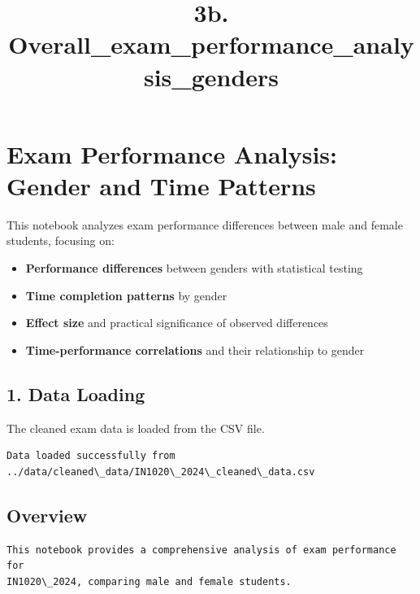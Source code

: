 \documentclass[11pt]{article}
\title{3b. Overall\_exam\_performance\_analysis\_genders}
\providecommand{\tightlist}{%
      \setlength{\itemsep}{0pt}\setlength{\parskip}{0pt}}
\begin{document}
    
    \maketitle
    
    

    
    \section{Exam Performance Analysis: Gender and Time
Patterns}\label{exam-performance-analysis-gender-and-time-patterns}

This notebook analyzes exam performance differences between male and
female students, focusing on:

\begin{itemize}
\tightlist
\item
  \textbf{Performance differences} between genders with statistical
  testing
\item
  \textbf{Time completion patterns} by gender
\item
  \textbf{Effect size} and practical significance of observed
  differences
\item
  \textbf{Time-performance correlations} and their relationship to
  gender
\end{itemize}

    \subsection{1. Data Loading}\label{data-loading}

The cleaned exam data is loaded from the CSV file.

    \begin{Verbatim}[commandchars=\\\{\}]
Data loaded successfully from ../data/cleaned\_data/IN1020\_2024\_cleaned\_data.csv
    \end{Verbatim}

    \subsection{Overview}\label{overview}

    \begin{Verbatim}[commandchars=\\\{\}]
This notebook provides a comprehensive analysis of exam performance for
IN1020\_2024, comparing male and female students.
    \end{Verbatim}
\end{document}
